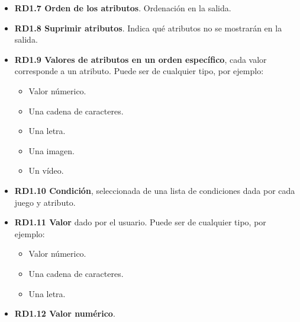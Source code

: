 \begin{itemize}
	\item \textbf{RD1.7 Orden de los atributos}. Ordenación en la salida.
	
	\item \textbf{RD1.8 Suprimir atributos}. Indica qué atributos no se mostrarán en la salida.
	
	\item \textbf{RD1.9 Valores de atributos en un orden específico}, cada valor corresponde a un atributo. Puede ser de cualquier tipo, por ejemplo:
	\begin{itemize}
		\item Valor númerico.
		\item Una cadena de caracteres.
		\item Una letra.
		\item Una imagen.
		\item Un vídeo.
	\end{itemize}
	
	\item \textbf{RD1.10 Condición}, seleccionada de una lista de condiciones dada por cada juego y atributo.
	
	\item \textbf{RD1.11 Valor} dado por el usuario. Puede ser de cualquier tipo, por ejemplo:
	\begin{itemize}
		\item Valor númerico.
		\item Una cadena de caracteres.
		\item Una letra.
	\end{itemize}
	
	\item \textbf{RD1.12 Valor numérico}.
\end{itemize}




